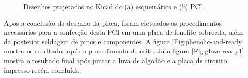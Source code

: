 \documentclass[
	12pt,				%
	openright,			%
	oneside,			%
	a4paper,			%
	english,			%
	brazil				%
	]{abntex2}
\begin{document}
	\begin{figure}[!htb]
		 \centering
		 \caption{ Desenhos projetados no Kicad do (a) esquemático e (b) PCI. }
		 \centering
		 \label{Fig:schematic-and-PCB}
	\end{figure}

			Após a conclusão do desenho da placa, foram efetuados os procedimentos necessários para a confecção desta PCI em uma placa de fenolite cobreada, além da posterior soldagem de pinos e componentes. A figura \ref{Fig:phenolic-and-ready} mostra os resultados após o procedimento descrito. Já a figura \ref{Fig:glove-ready1} mostra o resultado final após juntar a luva de algodão e a placa de circuito impresso recém concluída.
\end{document}
